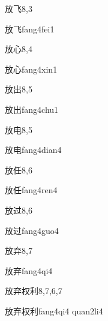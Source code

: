 \begin{entry}{放飞}{8,3}
  \begin{phonetics}{放飞}{fang4fei1}
  \end{phonetics}
\end{entry}

\begin{entry}{放心}{8,4}
  \begin{phonetics}{放心}{fang4xin1}
  \end{phonetics}
\end{entry}

\begin{entry}{放出}{8,5}
  \begin{phonetics}{放出}{fang4chu1}
  \end{phonetics}
\end{entry}

\begin{entry}{放电}{8,5}
  \begin{phonetics}{放电}{fang4dian4}
  \end{phonetics}
\end{entry}

\begin{entry}{放任}{8,6}
  \begin{phonetics}{放任}{fang4ren4}
  \end{phonetics}
\end{entry}

\begin{entry}{放过}{8,6}
  \begin{phonetics}{放过}{fang4guo4}
  \end{phonetics}
\end{entry}

\begin{entry}{放弃}{8,7}
  \begin{phonetics}{放弃}{fang4qi4}
  \end{phonetics}
\end{entry}

\begin{entry}{放弃权利}{8,7,6,7}
  \begin{phonetics}{放弃权利}{fang4qi4 quan2li4}
  \end{phonetics}
\end{entry}

